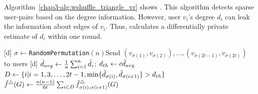 Algorithm~\ref{chap3-alg:wshuffle_triangle_vr} shows \AlgWSTriVR{}.
This algorithm detects sparse user-pairs based on the degree information.
However, user $v_i$'s degree $d_i$ can leak the information about edges of $v_i$.
Thus, \AlgWSTriVR{} calculates a differentially private estimate of $d_i$ within one round.

\setlength{\algomargin}{5mm}
\begin{algorithm}[t]
  \SetAlgoLined
  [d] $\sigma \leftarrow$\texttt{RandomPermutation}$(n)$\;
  [d] Send $(v_{\sigma(1)}, v_{\sigma(2)}), \ldots, (v_{\sigma(2t-1)}, v_{\sigma(2t)})$ to users\;
  [d] $\tilde{d}_{avg} \leftarrow \frac{1}{n} \sum_{i=1}^n \tilde{d}_i$; $d_{th} \leftarrow c \tilde{d}_{avg}$\;
  [d] $D \leftarrow \{i | i = 1, 3, \ldots, 2t-1,
  \min\{\tilde{d}_{\sigma(i)}, \tilde{d}_{\sigma(i+1)}\} > d_{th}\}$\;
  [d] $\hat{f}^\triangle(G) \leftarrow \frac{n(n-1)}{6t} \sum_{i \in D} \hat{f}_{\sigma(i),\sigma(i+1)}^\triangle(G)$\;
  [d] 
  \caption{Our triangle counting algorithm with variance reduction \AlgWSTriVR{}.
  \AlgWSLE{} is shown in Algorithm~\ref{chap3-alg:WSLE}.
  }\label{chap3-alg:wshuffle_triangle_vr}
\end{algorithm}


